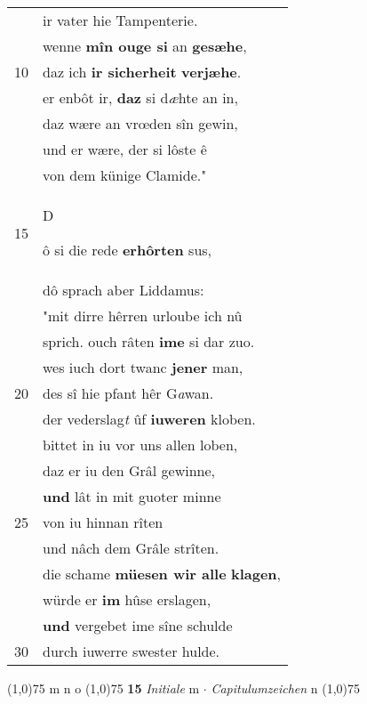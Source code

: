 \documentclass[8pt,a4paper,notitlepage]{article}
\begin{document}
\begin{table}[ht]
\begin{minipage}[t]{0.5\linewidth}
\begin{tabular}{rl}
 & ir vater hie Tampenterie.\\ 
 & wenne \textbf{mîn ouge si} an \textbf{gesæhe},\\ 
10 & daz ich \textbf{ir sicherheit} \textbf{verjæhe}.\\ 
 & er enbôt ir, \textbf{daz} si d\textit{æ}hte an in,\\ 
 & daz wære an vrœden sîn gewin,\\ 
 & und er wære, der si lôste ê\\ 
 & von dem künige Clamide."\\ 
15 & \begin{large}D\end{large}ô si die rede \textbf{erhôrten} sus,\\ 
 & dô sprach aber Liddamus:\\ 
 & "mit dirre hêrren urloube ich nû\\ 
 & sprich. ouch râten \textbf{ime} si dar zuo.\\ 
 & wes iuch dort twanc \textbf{jener} man,\\ 
20 & des sî hie pfant hêr G\textit{a}wan.\\ 
 & der vederslag\textit{t} ûf \textbf{iuweren} kloben.\\ 
 & bittet in iu vor uns allen loben,\\ 
 & daz er iu den Grâl gewinne,\\ 
 & \textbf{und} lât in mit guoter minne\\ 
25 & von iu hinnan rîten\\ 
 & und nâch dem Grâle strîten.\\ 
 & die schame \textbf{müesen wir alle} \textbf{klagen},\\ 
 & würde er \textbf{im} hûse erslagen,\\ 
 & \textbf{und} vergebet ime sîne schulde\\ 
30 & durch iuwerre swester hulde.\\ 
\end{tabular}
\scriptsize
\line(1,0){75} \newline
m n o \newline
\line(1,0){75} \newline
\textbf{15} \textit{Initiale} m   $\cdot$ \textit{Capitulumzeichen} n  \newline
\line(1,0){75} \newline

\end{minipage}
\end{table}
\end{document}

